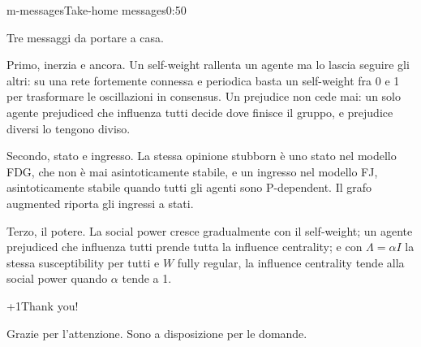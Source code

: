 \begin{slide}{m-messages}{Take-home messages}{0:50}
  \begin{discorso}
    \item Tre messaggi da portare a casa.
    \item Primo, inerzia e ancora. Un self-weight rallenta un agente ma lo lascia seguire gli altri: su una rete fortemente connessa e periodica basta un self-weight fra 0 e 1 per trasformare le oscillazioni in {\color{red}} {\color{blue}consensus.} Un {\color{red}} {\color{blue}prejudice} non cede mai: un solo agente prejudiced che influenza tutti decide dove finisce il gruppo, e {\color{red}} {\color{blue}prejudice} diversi lo tengono diviso.
    \item Secondo, stato e ingresso. La stessa opinione stubborn è uno stato nel modello FDG, che non è mai asintoticamente stabile, e un ingresso nel modello FJ, asintoticamente stabile quando tutti gli agenti sono P-dependent. Il grafo {\color{red}} {\color{blue}augmented} riporta gli ingressi a stati.
    \item Terzo, il potere. La social power cresce gradualmente con il self-weight; un agente prejudiced che influenza tutti prende tutta la influence centrality; e con {\color{red}$\Lambda=\alpha I$} {\color{blue}la stessa susceptibility per tutti} e $W$ fully regular, la influence centrality tende alla social power quando $\alpha$ tende a 1.
  \end{discorso}
\end{slide}

\begin{slidepag}{\the\numexpr{}+1\relax}{Thank you!}{}
  \begin{discorso}
    \item Grazie per l'attenzione. Sono a disposizione per le domande.
  \end{discorso}
\end{slidepag}


